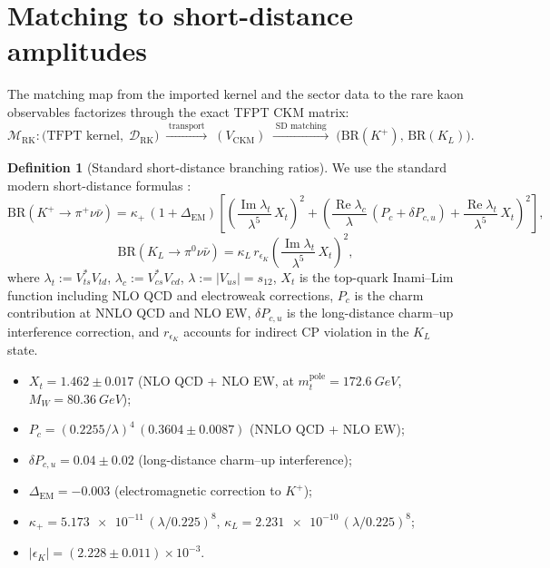 \documentclass[11pt,a4paper]{article}
\theoremstyle{definition}
\newtheorem{definition}[theorem]{Definition}
\theoremstyle{remark}
\DeclareMathOperator{\im}{Im}
\DeclareMathOperator{\re}{Re}
\newcommand{\BR}{\mathrm{BR}}
\numberwithin{equation}{section}
\begin{document}
\section{Matching to short-distance amplitudes}
\label{sec:matching}

The matching map from the imported kernel and the sector data to the rare
kaon observables factorizes through the exact TFPT CKM matrix:
\begin{equation}
\label{eq:matching-map}
\mathcal M_{\mathrm{RK}}
:
\bigl(\text{TFPT kernel},\;\mathcal D_{\mathrm{RK}}\bigr)
\;\xrightarrow{\;\text{transport}\;}\;
(V_{\mathrm{CKM}})
\;\xrightarrow{\;\text{SD matching}\;}\;
\bigl(\BR(K^+),\,\BR(K_L)\bigr).
\end{equation}

\begin{definition}[Standard short-distance branching ratios]
\label{def:br-formulas}
We use the standard modern short-distance formulas \cite{BrodGorbahnStamou}:
\begin{equation}
\label{eq:br-kplus}
\BR(K^+\!\to\pi^+\nu\bar\nu)
=
\kappa_+\,(1+\Delta_{\mathrm{EM}})
\left[
\left(\frac{\im\lambda_t}{\lambda^5}\,X_t\right)^{\!2}
+
\left(
\frac{\re\lambda_c}{\lambda}\,(P_c+\delta P_{c,u})
+
\frac{\re\lambda_t}{\lambda^5}\,X_t
\right)^{\!2}
\right],
\end{equation}
\begin{equation}
\label{eq:br-kl}
\BR(K_L\to\pi^0\nu\bar\nu)
=
\kappa_L\,r_{\epsilon_K}
\left(\frac{\im\lambda_t}{\lambda^5}\,X_t\right)^{\!2},
\end{equation}
where $\lambda_t:=V_{ts}^*V_{td}$, $\lambda_c:=V_{cs}^*V_{cd}$,
$\lambda:=|V_{us}|=s_{12}$,
$X_t$ is the top-quark Inami--Lim function including NLO QCD and
electroweak corrections, $P_c$ is the charm contribution at NNLO QCD
and NLO EW, $\delta P_{c,u}$ is the long-distance charm--up
interference correction, and $r_{\epsilon_K}$ accounts for indirect
CP violation in the $K_L$ state.
\end{definition}

\begin{tcolorbox}[colback=gray!4, colframe=gray!60, breakable,
    title={\textbf{Short-distance input parameters}}, fonttitle=\bfseries]
\begin{itemize}[leftmargin=1.6em, itemsep=0.3em]
\item $X_t = 1.462\pm 0.017$ \quad (NLO QCD + NLO EW, at
      $m_t^{\mathrm{pole}}=\SI{172.6}{GeV}$, $M_W=\SI{80.36}{GeV}$);
\item $P_c = (0.2255/\lambda)^4\,(0.3604\pm 0.0087)$ \quad (NNLO QCD + NLO EW);
\item $\delta P_{c,u}=0.04\pm 0.02$ \quad (long-distance charm--up interference);
\item $\Delta_{\mathrm{EM}}=-0.003$ \quad (electromagnetic correction to $K^+$);
\item $\kappa_+=\num{5.173e-11}\,(\lambda/0.225)^8$,\;
      $\kappa_L=\num{2.231e-10}\,(\lambda/0.225)^8$;
\item $|\epsilon_K|=(\num{2.228}\pm\num{0.011})\times 10^{-3}$.
\end{itemize}
\end{tcolorbox}
\end{document}
